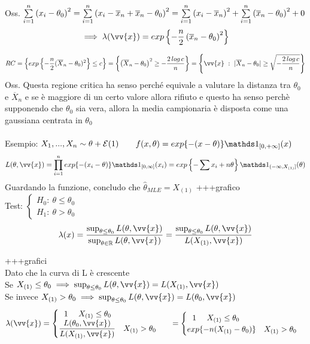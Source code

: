 Oss. $\sum\limits_{i=1}^{n} \left( x_i -\theta_0  \right)^2 = \sum\limits_{i=1}^{n} \left( x_i -\overline{x}_n  + \overline{x}_n -\theta_0 \right)^2 = \sum\limits_{i=1}^{n} \left( x_i -\overline{x}_n  \right)^2 + \sum\limits_{i=1}^{n} \left( \overline{x}_n -\theta_0  \right)^2 + 0$ 
\[
\implies \lambda(\vv{x})= exp\OOO -\frac{n}{2} \O \overline{x}_n -\theta_0 \C^2 \CCC
\]

\[
RC= \OOO exp\OOO -\frac{n}{2} (\overline{X}_n -\theta_0)^2 \CCC \le c \CCC = \OOO \O \overline{X}_n -\theta_0\C^2 \ge - \frac{2\, log\, c}{n} \CCC = \OOO \vv{x} \ : \ |\overline{X}_n -\theta_0| \ge \sqrt{-\frac{2\, log\, c}{n}} \CCC
\]
\phantom{}\smallskip
Oss. Questa regione critica ha senso perché equivale a valutare la distanza tra $\theta_0$ e $\overline{X}_n$ e se è maggiore di un certo valore allora rifiuto e questo ha senso perchè supponendo che $\theta_0$ sia vera, allora la media campionaria è disposta come una gaussiana centrata in $\theta_0$\\ \\


Esempio: $X_1,...,X_n\sim \theta + \mathcal E (1)$ \ \ \ $f(x,\theta) = exp\{-(x-\theta)\} \II_{[0,+\infty]}(x)$
\[
L(\theta,\vv{x}) = \Prod{i=1}{n} exp\{-(x_i-\theta)\} \II_{[0,\infty]}(x_i) = exp\OOO -\sum x_i +n\theta \CCC \II_{(-\infty,X_{(1)}]}(\theta)
\]
Guardando la funzione, concludo che $\hat{\theta}_{MLE}=X_{(1)}$ +++grafico \\


Test: $\begin{cases}
    H_0 : \ \theta\le \theta_0\\
    H_1 : \ \theta>\theta_0
\end{cases}$
\[
\lambda(x)=\frac{\sup_{\theta\le\theta_0 } L(\theta,\vv{x})}{\sup_{\theta\in\R}L(\theta,\vv{x})} = \frac{\sup_{\theta\le\theta_0 } L(\theta,\vv{x})}{L(X_{(1)},\vv{x})}
\]

+++grafici\\

Dato che la curva di L è crescente\\
Se $X_{(1)}\le \theta_0 \implies \sup_{\theta\le\theta_0} L(\theta,\vv{x})= L (X_{(1)},\vv{x})$\\
Se invece $X_{(1)}>\theta_0 \implies \sup_{\theta\le\theta_0} L(\theta,\vv{x}) = L(\theta_0, \vv{x})$\\
\[
\lambda(\vv{x}) = \begin{cases}
    \ \ 1 \ \ \ \ X_{(1)}\le \theta_0\\
    \frac{L(\theta_0,\vv{x})}{L(X_{(1)},\vv{x})} \ \ \ X_{(1)}>\theta_0
\end{cases} \ \ = \begin{cases}
    \ \ 1 \ \ \ \ X_{(1)}\le \theta_0\\
    exp\{-n(X_{(1)}-\theta_0) \} \ \ \ X_{(1)}>\theta_0
\end{cases}
\]

